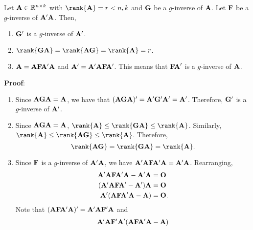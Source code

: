 \begin{Theorem}{}{}
    Let $ \mathbf{A}\in\mathbb{R}^{n\times k} $ with $ \rank{\Matrix{A}}=r<\min{n,k} $ and $ \mathbf{G} $
    be a $ g $-inverse of $ \mathbf{A} $. Let $ \mathbf{F} $
    be a $ g $-inverse of $ \mathbf{A}'\mathbf{A} $. Then,
    \begin{enumerate}[(1)]
        \item $ \mathbf{G}' $ is a $ g $-inverse of $ \mathbf{A}' $.
        \item $ \rank{\Matrix{GA}}=\rank{\Matrix{AG}}=\rank{\Matrix{A}}=r $.
        \item $ \mathbf{A}=\mathbf{A}\mathbf{F}\mathbf{A}'\mathbf{A} $ and $ \mathbf{A}'=\mathbf{A}'\mathbf{A}\mathbf{F}\mathbf{A}' $. This means
              that $ \mathbf{FA}' $ is a $ g $-inverse of $ \mathbf{A} $.
    \end{enumerate}
    \tcblower{}
    \textbf{Proof}:
    \begin{enumerate}[(1)]
        \item Since $ \mathbf{AGA}=\mathbf{A} $, we have that $ (\mathbf{AGA})'=\mathbf{A}'\mathbf{G}'\mathbf{A}'=\mathbf{A}' $.
              Therefore, $ \mathbf{G}' $ is a $ g $-inverse of $ \mathbf{A}' $.
        \item Since $ \mathbf{AGA}=\mathbf{A} $, $ \rank{\Matrix{A}}\le \rank{\Matrix{GA}}\le \rank{\Matrix{A}} $. Similarly,
              $ \rank{\Matrix{A}}\le \rank{\Matrix{AG}}\le \rank{\Matrix{A}} $. Therefore,
              \[ \rank{\Matrix{AG}}=\rank{\Matrix{GA}}=\rank{\Matrix{A}}. \]
        \item Since $ \mathbf{F} $ is a $ g $-inverse of $ \mathbf{A}'\mathbf{A} $, we have
              $ \mathbf{A}'\mathbf{A}\mathbf{F}\mathbf{A}'\mathbf{A}=\mathbf{A}'\mathbf{A} $. Rearranging,
              \begin{align*}
                  \mathbf{A}'\mathbf{A}\mathbf{F}\mathbf{A}'\mathbf{A}-\mathbf{A}'\mathbf{A} & =\mathbf{O}  \\
                  (\mathbf{A}'\mathbf{A}\mathbf{F}\mathbf{A}'-\mathbf{A}')\mathbf{A}         & =\mathbf{O}  \\
                  \mathbf{A}'(\mathbf{A}\mathbf{F}\mathbf{A}'\mathbf{A}-\mathbf{A})          & =\mathbf{O}.
              \end{align*}
              Note that $ (\mathbf{A}\mathbf{F}\mathbf{A}'\mathbf{A})'=\mathbf{A}'\mathbf{A}\mathbf{F}'\mathbf{A} $ and
              \begin{align*}
                  \Matrix{A}'\Matrix{A}\Matrix{F}'\Matrix{A}'(\Matrix{A}\Matrix{F}\Matrix{A}'\Matrix{A}-\Matrix{A})

\end{align*}
\end{enumerate}
\end{Theorem}
